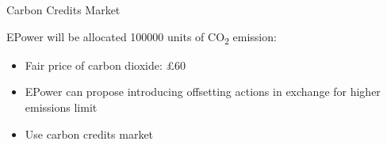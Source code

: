 \documentclass{beamer}
\renewcommand{\chartheight}{5.5cm}
\begin{document}
  \begin{frame}{Carbon Credits Market}
  
 EPower will be allocated 100000 units of CO\textsubscript{2} emission:
      \small
        \begin{itemize}
            \item Fair price of carbon dioxide: £60

            \item EPower can propose introducing offsetting actions in exchange for higher emissions limit 
            \item Use carbon credits market
        \end{itemize}      
    
        

        
        \renewcommand{\chartheight}{4.5cm}
             \begin{figure}
            	\centering
            \end{figure}
               
        
    \end{frame}
        
    
\end{document}
